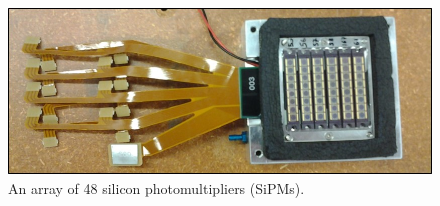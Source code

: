\begin{figure}
\centering
\includegraphics[width=\linewidth]{Figures/SiPM.jpg}
\caption{An array of 48 silicon photomultipliers (SiPMs).}
\label{fig:SiPM}
\end{figure}




